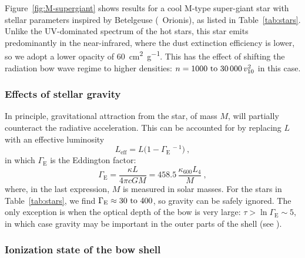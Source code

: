 \message{ !name(dusty-bow-wave.tex)}\documentclass[useAMS, usenatbib, a4paper]{mnras}
\begin{document}
Figure~\ref{fig:M-supergiant} shows results for a cool M-type
super-giant star with stellar parameters inspired by Betelgeuse
(\chemalpha~Orionis), as listed in Table~\ref{tab:stars}.  Unlike the
UV-dominated spectrum of the hot stars, this star emits predominantly
in the near-infrared, where the dust extinction efficiency is lower,
so we adopt a lower opacity of \SI{60}{cm^2.g^{-1}}.  This has the
effect of shifting the radiation bow wave regime to higher densities:
\(n = \text{\numrange{1000}{30 000}}\, v_{10}^2\) in this case.


\subsubsection{Effects of stellar gravity}
\label{sec:effects-gravity}

In principle, gravitational attraction from the star, of mass \(M\),
will partially counteract the radiative acceleration.  This can be
accounted for by replacing \(L\) with an effective luminosity
\newcommand\Edd{\ensuremath{_{\text{E}}}}
\begin{equation}
  \label{eq:effective-luminosity}
  L_{\text{eff}} = L \bigl(1 - \Gamma\Edd^{\,-1}\bigr) \ ,
\end{equation}
in which \(\Gamma\Edd\) is the Eddington factor:
\begin{equation}
  \label{eq:eddington-factor}
  \Gamma\Edd = \frac{\kappa L}{4\pi c G M} = 458.5 \, \frac{\kappa_{600} L_4}{ M } \ ,
\end{equation}
where, in the last expression, \(M\) is measured in solar masses.  For
the stars in Table~\ref{tab:stars}, we find
\(\Gamma\Edd \approx \text{\numrange{30}{400}}\), so gravity can be safely
ignored.  The only exception is when the optical depth of the bow is
very large: \(\tau > \ln\Gamma\Edd \sim 5\), in which case gravity may be
important in the outer parts of the shell (see
\citealt{Rodriguez-Ramirez:2016b}).



\subsubsection{Ionization state of the bow shell}
\label{sec:trapp-ioniz-front}

\newcommand\alphaB{\ensuremath{\alpha_{\text{B}}}}
\newcommand\shell{\ensuremath{_{\text{sh}}}}
\end{document}
